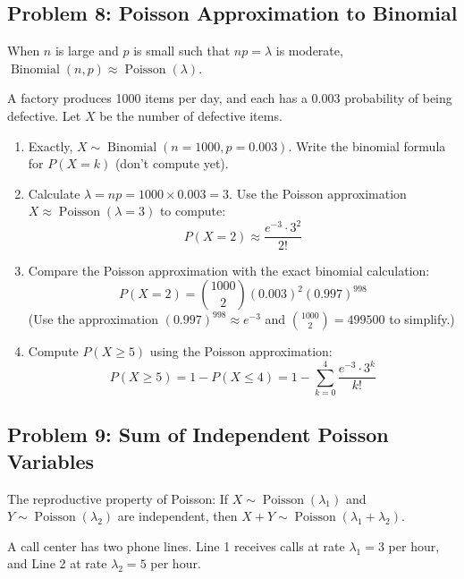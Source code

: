 \documentclass[12pt]{article}
\DeclareMathOperator{\Binom}{Binomial}
\DeclareMathOperator{\Pois}{Poisson}
\begin{document}
\subsection*{Problem 8: Poisson Approximation to Binomial}

When \(n\) is large and \(p\) is small such that \(np = \lambda\) is moderate, \(\Binom(n, p) \approx \Pois(\lambda)\).

A factory produces 1000 items per day, and each has a 0.003 probability of being defective. Let \(X\) be the number of defective items.

\begin{enumerate}[label=(\alph*)]
\item Exactly, \(X \sim \Binom(n = 1000, p = 0.003)\). Write the binomial formula for \(P(X = k)\) (don't compute yet).

\item Calculate \(\lambda = np = 1000 \times 0.003 = 3\). Use the Poisson approximation \(X \approx \Pois(\lambda = 3)\) to compute:
\[
P(X = 2) \approx \frac{e^{-3} \cdot 3^2}{2!}
\]

\item Compare the Poisson approximation with the exact binomial calculation:
\[
P(X = 2) = \binom{1000}{2}(0.003)^2(0.997)^{998}
\]
(Use the approximation \((0.997)^{998} \approx e^{-3}\) and \(\binom{1000}{2} = 499500\) to simplify.)

\item Compute \(P(X \geq 5)\) using the Poisson approximation:
\[
P(X \geq 5) = 1 - P(X \leq 4) = 1 - \sum_{k=0}^{4} \frac{e^{-3} \cdot 3^k}{k!}
\]
\end{enumerate}

\subsection*{Problem 9: Sum of Independent Poisson Variables}

The reproductive property of Poisson: If \(X \sim \Pois(\lambda_1)\) and \(Y \sim \Pois(\lambda_2)\) are independent, then \(X + Y \sim \Pois(\lambda_1 + \lambda_2)\).

A call center has two phone lines. Line 1 receives calls at rate \(\lambda_1 = 3\) per hour, and Line 2 at rate \(\lambda_2 = 5\) per hour.
\end{document}
